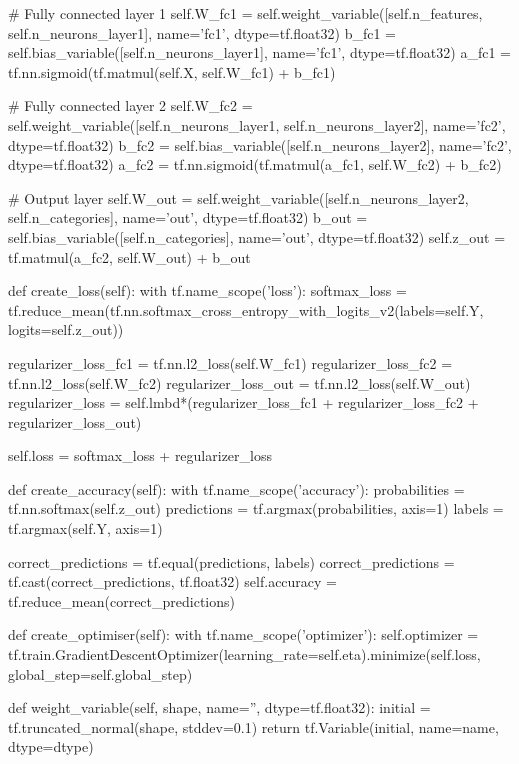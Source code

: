 \documentclass[%
oneside,                 %
final,                   %
10pt]{article}
\begin{document}
            # Fully connected layer 1
            self.W_fc1 = self.weight_variable([self.n_features, self.n_neurons_layer1], name='fc1', dtype=tf.float32)
            b_fc1 = self.bias_variable([self.n_neurons_layer1], name='fc1', dtype=tf.float32)
            a_fc1 = tf.nn.sigmoid(tf.matmul(self.X, self.W_fc1) + b_fc1)
            
            # Fully connected layer 2
            self.W_fc2 = self.weight_variable([self.n_neurons_layer1, self.n_neurons_layer2], name='fc2', dtype=tf.float32)
            b_fc2 = self.bias_variable([self.n_neurons_layer2], name='fc2', dtype=tf.float32)
            a_fc2 = tf.nn.sigmoid(tf.matmul(a_fc1, self.W_fc2) + b_fc2)
            
            # Output layer
            self.W_out = self.weight_variable([self.n_neurons_layer2, self.n_categories], name='out', dtype=tf.float32)
            b_out = self.bias_variable([self.n_categories], name='out', dtype=tf.float32)
            self.z_out = tf.matmul(a_fc2, self.W_out) + b_out
    
    def create_loss(self):
        with tf.name_scope('loss'):
            softmax_loss = tf.reduce_mean(tf.nn.softmax_cross_entropy_with_logits_v2(labels=self.Y, logits=self.z_out))
            
            regularizer_loss_fc1 = tf.nn.l2_loss(self.W_fc1)
            regularizer_loss_fc2 = tf.nn.l2_loss(self.W_fc2)
            regularizer_loss_out = tf.nn.l2_loss(self.W_out)
            regularizer_loss = self.lmbd*(regularizer_loss_fc1 + regularizer_loss_fc2 + regularizer_loss_out)
            
            self.loss = softmax_loss + regularizer_loss

    def create_accuracy(self):
        with tf.name_scope('accuracy'):
            probabilities = tf.nn.softmax(self.z_out)
            predictions = tf.argmax(probabilities, axis=1)
            labels = tf.argmax(self.Y, axis=1)
            
            correct_predictions = tf.equal(predictions, labels)
            correct_predictions = tf.cast(correct_predictions, tf.float32)
            self.accuracy = tf.reduce_mean(correct_predictions)
    
    def create_optimiser(self):
        with tf.name_scope('optimizer'):
            self.optimizer = tf.train.GradientDescentOptimizer(learning_rate=self.eta).minimize(self.loss, global_step=self.global_step)
            
    def weight_variable(self, shape, name='', dtype=tf.float32):
        initial = tf.truncated_normal(shape, stddev=0.1)
        return tf.Variable(initial, name=name, dtype=dtype)
    
\end{document}
